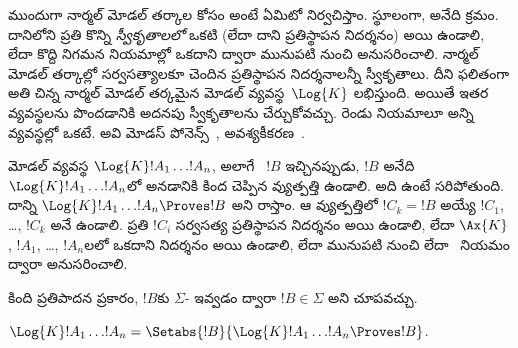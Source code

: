 \documentclass[../../../include/open-logic-section]{subfiles}
\begin{document}


ముందుగా నార్మల్ మోడల్ తర్కాల కోసం 
అంటే ఏమిటో నిర్వచిస్తాం. స్థూలంగా, 
అనేది  క్రమం. దానిలోని ప్రతి
 కొన్ని \emph{స్వీకృతాలలో} ఒకటి
(లేదా దాని ప్రతిస్థాపన నిదర్శనం) అయి ఉండాలి, లేదా కొద్ది
నిగమన నియమాల్లో ఒకదాని ద్వారా మునుపటి 
నుంచి అనుసరించాలి. నార్మల్ మోడల్ తర్కాల్లో సర్వసత్యాలకూ
చెందిన ప్రతిస్థాపన నిదర్శనాలన్నీ స్వీకృతాలు. దీని ఫలితంగా అతి చిన్న నార్మల్
మోడల్ తర్కమైన మోడల్ వ్యవస్థ~$\Log{K}$ లభిస్తుంది. అయితే ఇతర
వ్యవస్థలను పొందడానికి అదనపు స్వీకృతాలను చేర్చుకోవచ్చు.
రెండు నియమాలూ అన్ని వ్యవస్థల్లో ఒకటే. అవి మోడస్ పోనెన్స్~\MP{}, అవశ్యకీకరణ~\Nec.

\begin{defn}
  మోడల్ వ్యవస్థ $\Log{K} !A_1 \dots !A_n$, అలాగే
  ~$!B$ ఇచ్చినప్పుడు,
  $!B$ అనేది $\Log{K} !A_1 \dots !A_n$లో
  \emph{} అనడానికి కింద చెప్పిన వ్యుత్పత్తి ఉండాలి. అది ఉంటే సరిపోతుంది.
  దాన్ని $\Log{K} !A_1 \dots !A_n \Proves !B$ అని రాస్తాం.
  ఆ వ్యుత్పత్తిలో $!C_k = !B$
  అయ్యే $!C_1$, \dots, $!C_k$ అనే 
  ఉండాలి. ప్రతి $!C_i$
  సర్వసత్య ప్రతిస్థాపన నిదర్శనం అయి ఉండాలి, లేదా
  $\Ax{K}$, $!A_1$,
  \dots, $!A_n$లలో ఒకదాని నిదర్శనం అయి ఉండాలి, లేదా
  మునుపటి  నుంచి \MP{} లేదా~\Nec{}
  నియమం ద్వారా అనుసరించాలి.
\end{defn}

కింది ప్రతిపాదన ప్రకారం, $!B$కు $\Sigma$-
ఇవ్వడం ద్వారా $!B \in \Sigma$ అని చూపవచ్చు.

\begin{prop}
  $\Log{K} !A_1 \dots !A_n = \Setabs{!B}{\Log{K} !A_1 \dots !A_n \Proves !B}$.
\end{prop}
\end{document}
